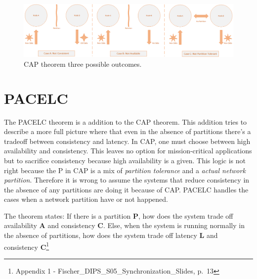 \begin{figure}[h!]
	\centering
	\includegraphics[width=0.9\linewidth]{consistency/fig/cap_proof.png}
	\caption{CAP theorem three possible outcomes.}
	\label{fig:cap_proof}
\end{figure}


\section{PACELC}
The PACELC theorem is a addition to the CAP theorem. This addition tries to describe a more full picture where that even in the absence of partitions there's a tradeoff between consistency and latency. In CAP, one must choose between high availability and consistency. This leaves no option for mission-critical applications but to sacrifice consistency because high availability is a given. This logic is not right because the P in CAP is a mix of \textit{partition tolerance} and a \textit{actual network partition}. Therefore it is wrong to assume the systems that reduce consistency in the absence of any partitions are doing it because of CAP. PACELC handles the cases when a network partition have or not happened.

\noindent The theorem states: If there is a partition \textbf{P}, how does the system trade off availability \textbf{A} and consistency \textbf{C}. Else, when the system is running normally in the absence of partitions, how does the system trade off latency \textbf{L} and consistency \textbf{C}\footnote{Appendix 1 - Fischer\_DIPS\_S05\_Synchronization\_Slides, p.~13}

